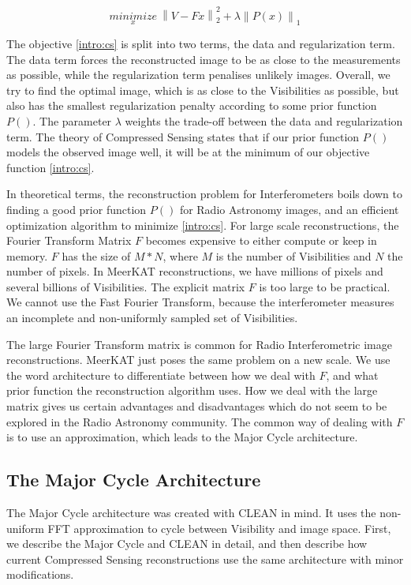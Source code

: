 \begin{equation}\label{intro:cs}
\underset{x}{minimize} \: \left \| V - Fx \right \|_2^2 + \lambda \left \| P(x) \right \|_1
\end{equation}

The objective \eqref{intro:cs} is split into two terms, the data and regularization term. The data term forces the reconstructed image to be as close to the measurements as possible, while the regularization term penalises unlikely images. Overall, we try to find the optimal image, which is as close to the Visibilities as possible, but also has the smallest regularization penalty according to some prior function $P()$. The parameter $\lambda$ weights the trade-off between the data and regularization term. The theory of Compressed Sensing states that if our prior function $P()$ models the observed image well, it will be at the minimum of our objective function \eqref{intro:cs}.

In theoretical terms, the reconstruction problem for Interferometers boils down to finding a good prior function $P()$ for Radio Astronomy images, and an efficient optimization algorithm to minimize \eqref{intro:cs}. For large scale reconstructions, the Fourier Transform Matrix $F$ becomes expensive to either compute or keep in memory. $F$ has the size of $M*N$, where $M$ is the number of Visibilities and $N$ the number of pixels. In MeerKAT reconstructions, we have millions of pixels and several billions of Visibilities. The explicit matrix $F$ is too large to be practical. We cannot use the Fast Fourier Transform, because the interferometer measures an incomplete and non-uniformly sampled set of Visibilities.

The large Fourier Transform matrix is common for Radio Interferometric image reconstructions. MeerKAT just poses the same problem on a new scale. We use the word architecture to differentiate between how we deal with $F$, and what prior function the reconstruction algorithm uses. How we deal with the large matrix gives us certain advantages and disadvantages which do not seem to be explored in the Radio Astronomy community. The common way of dealing with $F$ is to use an approximation, which leads to the Major Cycle architecture. 


\subsection{The Major Cycle Architecture}
The Major Cycle architecture was created with CLEAN in mind. It uses the non-uniform FFT approximation to cycle between Visibility and image space. First, we describe the Major Cycle and CLEAN in detail, and then describe how current Compressed Sensing reconstructions use the same architecture with minor modifications.

